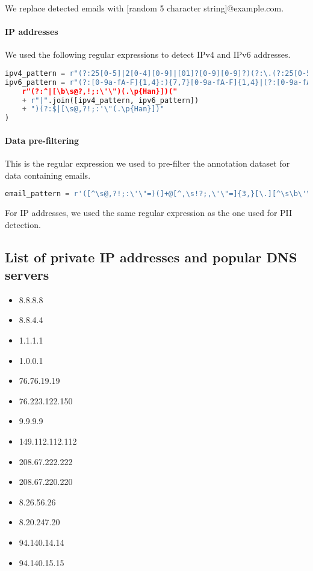 \documentclass[10pt]{article} \usepackage{iclr2023_conference,times}
\begin{document}
We replace detected emails with [random 5 character string]@example.com. 

\paragraph{IP addresses} We used the following regular expressions to detect IPv4 and IPv6 addresses.

\begin{lstlisting}[language=python] 
ipv4_pattern = r"(?:25[0-5]|2[0-4][0-9]|[01]?[0-9][0-9]?)(?:\.(?:25[0-5]|2[0-4][0-9]|[01]?[0-9][0-9]?)){3}"
ipv6_pattern = r"(?:[0-9a-fA-F]{1,4}:){7,7}[0-9a-fA-F]{1,4}|(?:[0-9a-fA-F]{1,4}:){1,7}:|(?:[0-9a-fA-F]{1,4}:){1,6}:[0-9a-fA-F]{1,4}|(?:[0-9a-fA-F]{1,4}:){1,5}(?::[0-9a-fA-F]{1,4}){1,2}|(?:[0-9a-fA-F]{1,4}:){1,4}(?::[0-9a-fA-F]{1,4}){1,3}|(?:[0-9a-fA-F]{1,4}:){1,3}(?::[0-9a-fA-F]{1,4}){1,4}|(?:[0-9a-fA-F]{1,4}:){1,2}(?::[0-9a-fA-F]{1,4}){1,5}|[0-9a-fA-F]{1,4}:(?:(?::[0-9a-fA-F]{1,4}){1,6})|:(?:(?::[0-9a-fA-F]{1,4}){1,7}|:)|fe80:(?::[0-9a-fA-F]{0,4}){0,4}ip_pattern = (
    r"(?:^|[\b\s@?,!;:\'\")(.\p{Han}])("
    + r"|".join([ipv4_pattern, ipv6_pattern])
    + ")(?:$|[\s@,?!;:'\"(.\p{Han}])"
)
\end{lstlisting}
\paragraph{Data pre-filtering}
This is the regular expression we used to pre-filter the annotation dataset for data containing emails.
\begin{lstlisting}[language=python] 
email_pattern = r'([^\s@,?!;:\'\"=)(]+@[^,\s!?;,\'\"=]{3,}[\.][^\s\b\'\"@,?!;:)(.]+)'
\end{lstlisting}
For IP addresses, we used the same regular expression as the one used for PII detection.


\subsection{List of private IP addresses and popular DNS servers}\label{sec:privateIPaddress}
\begin{itemize}
\item 8.8.8.8
\item 8.8.4.4
\item 1.1.1.1
\item 1.0.0.1
\item 76.76.19.19
\item 76.223.122.150
\item 9.9.9.9
\item 149.112.112.112
\item 208.67.222.222
\item 208.67.220.220
\item 8.26.56.26
\item 8.20.247.20
\item 94.140.14.14
\item 94.140.15.15
\end{itemize}
\end{document}
